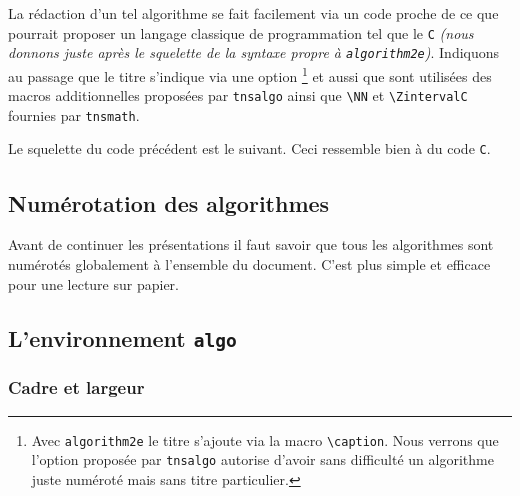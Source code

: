 \documentclass[12pt,a4paper]{article}
\theoremstyle{definition}
\newcommand\env[1]{\texttt{#1}}
\newcommand\macro[1]{\env{\textbackslash{}#1}}
\begin{document}
\bigskip

\bigskip


La rédaction d'un tel algorithme se fait facilement via un code proche de ce que pourrait proposer un langage classique de programmation tel que le \Verb#C# \emph{(nous donnons juste après le squelette de la syntaxe propre à \texttt{algorithm2e})}.
Indiquons au passage que le titre s'indique via une option
\footnote{
	Avec \texttt{algorithm2e} le titre s'ajoute via la macro \macro{caption}.
	Nous verrons que l'option proposée par \texttt{tnsalgo} autorise d'avoir sans difficulté un algorithme juste numéroté mais sans titre particulier.
}
et aussi que sont utilisées des macros additionnelles proposées par \verb#tnsalgo# ainsi que \macro{NN} et \macro{ZintervalC} fournies par \verb#tnsmath#.




Le squelette du code précédent est le suivant. Ceci ressemble bien à du code \verb#C#. 


\begin{latexex-alone}

\end{latexex-alone}




\subsection{Numérotation des algorithmes}

Avant de continuer les présentations il faut savoir que tous les algorithmes sont numérotés globalement à l'ensemble du document. C'est plus simple et efficace pour une lecture sur papier.

\subsection{L'environnement \texttt{algo}}

\subsubsection{Cadre et largeur}
\end{document}
